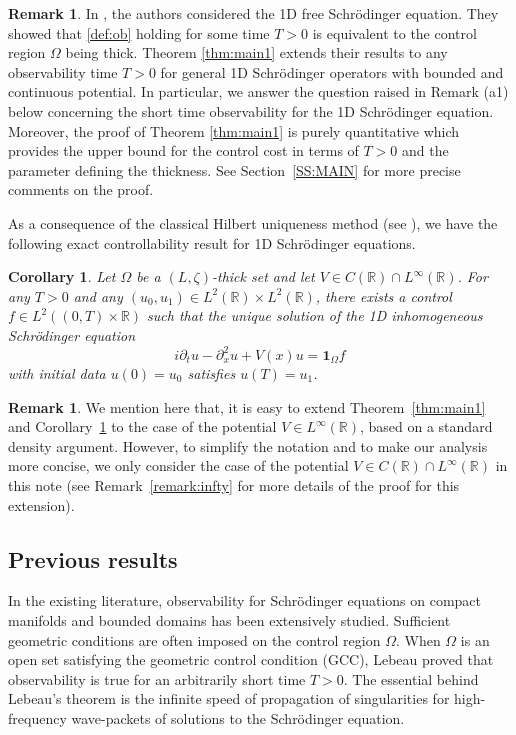 \documentclass[a4paper,reqno]{amsart}
\newtheorem{corollary}[theorem]{Corollary}
\theoremstyle{definition}
\newtheorem{remark}[theorem]{Remark}
\numberwithin{equation}{section}
\newcommand{\R}{\mathbb{R}}
\def \R {{\mathbb{R} }}
\begin{document}
  \begin{remark}
	In \cite[Theorem 1.1]{HWW}, the authors considered the 1D free Schr\"odinger equation. They showed that \eqref{def:ob} holding for some time $T>0$ is equivalent to the control region $\Omega$ being thick. Theorem \ref{thm:main1} extends their results to any observability time $T>0$ for general 1D Schr\"odinger operators with bounded and continuous potential. In particular, we answer the question raised in Remark (a1) below \cite[Theorem 1.1]{HWW} concerning the short time observability for the 1D Schr\"odinger equation. Moreover, the proof of Theorem \ref{thm:main1} is purely quantitative which provides the upper bound for the control cost in terms of $T>0$ and the parameter defining the thickness. See Section~\ref{SS:MAIN} for more precise comments on the proof.
\end{remark} 

As a consequence of the classical Hilbert uniqueness method (see \cite{Li}), we have the following exact controllability result for 1D Schr\"odinger equations.
\begin{corollary}\label{cor:control}
Let $\Omega$ be a $(L,\zeta)$-thick set and let $V\in C(\R)\cap L^{\infty}(\R)$.	For any $T>0$ and any $(u_0,u_1)\in L^2(\R)\times L^{2}(\R)$, there exists a control $f\in L^2((0,T)\times\R)$ such that the unique solution of the 1D inhomogeneous Schr\"odinger equation
\begin{equation*}
 i\partial_t u-\partial_x^2 u+V(x)u={\mathbf{1}}_{\Omega}f
\end{equation*}
	with initial data $u(0)=u_{0}$ satisfies $u(T)=u_1$.
\end{corollary}

\begin{remark}\label{remark:intro}
We mention here that, it is easy to extend Theorem~\ref{thm:main1} and Corollary~\ref{cor:control} to the case of the potential $V\in L^{\infty}(\R)$, based on a standard density argument. However, to simplify the notation and to make our analysis more concise, we only consider the case of the potential $V\in C(\R)\cap L^{\infty}(\R)$ in this note (see Remark~\ref{remark:infty} for more details of the proof for this extension).
\end{remark}

\subsection{Previous results}
In the existing literature, observability for Schr\"odinger equations on compact manifolds and bounded domains has been extensively studied. Sufficient geometric conditions are often imposed on the control region $\Omega$. When $\Omega$ is an open set satisfying the geometric control condition (GCC), Lebeau \cite{Le} proved that observability is true for an arbitrarily short time \(T>0\). The essential behind  Lebeau's theorem is the infinite speed of propagation of singularities for high-frequency wave-packets of solutions to the Schr\"odinger equation.
\end{document}
